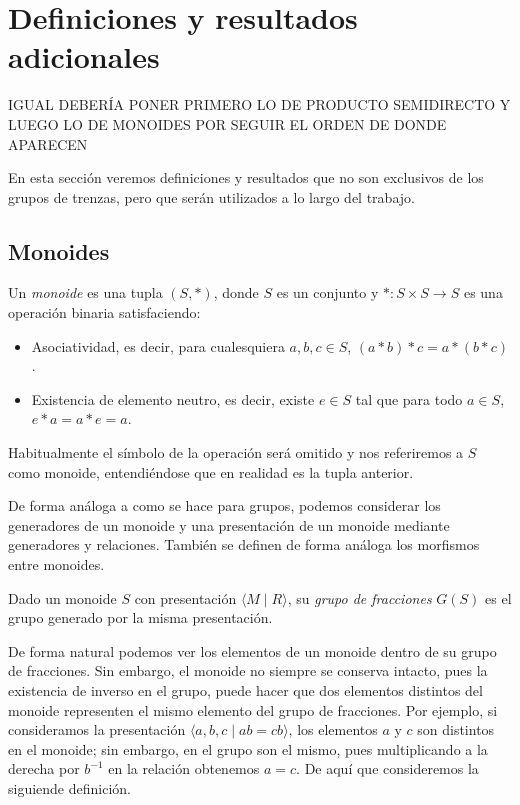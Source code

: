 \documentclass[TFG.tex]{subfiles}
\begin{document}
\section{Definiciones y resultados adicionales}

IGUAL DEBERÍA PONER PRIMERO LO DE PRODUCTO SEMIDIRECTO Y LUEGO LO DE MONOIDES POR SEGUIR EL ORDEN DE DONDE APARECEN

En esta sección veremos definiciones y resultados que no son exclusivos de los grupos de trenzas, pero que serán utilizados a lo largo del trabajo. 

\subsection{Monoides}

\begin{defi}
Un \emph{monoide} es una tupla $(S,*)$, donde $S$ es un conjunto y $*:S\times S\to S$ es una operación binaria satisfaciendo:
\begin{itemize}
\item Asociatividad, es decir, para cualesquiera $a,b,c\in S$, $(a*b)*c=a*(b*c)$.
\item Existencia de elemento neutro, es decir, existe $e\in S$ tal que para todo $a\in S$, $e*a=a*e=a$. 
\end{itemize}
Habitualmente el símbolo de la operación será omitido y nos referiremos a $S$ como monoide, entendiéndose que en realidad es la tupla anterior.
\end{defi}

De forma análoga a como se hace para grupos, podemos considerar los generadores de un monoide y una presentación de un monoide mediante generadores y relaciones. También se definen de forma análoga los morfismos entre monoides. 

\begin{defi}
Dado un monoide $S$ con presentación $\langle M\mid R\rangle$, su \emph{grupo de fracciones} $G(S)$ es el grupo generado por la misma presentación.
\end{defi}

De forma natural podemos ver los elementos de un monoide dentro de su grupo de fracciones. Sin embargo, el monoide no siempre se conserva intacto, pues la existencia de inverso en el grupo, puede hacer que dos elementos distintos del monoide representen el mismo elemento del grupo de fracciones. Por ejemplo, si consideramos la presentación $\langle a,b,c\mid ab=cb\rangle$, los elementos $a$ y $c$ son distintos en el monoide; sin embargo, en el grupo son el mismo, pues multiplicando a la derecha por $b^{-1}$ en la relación obtenemos $a=c$. De aquí que consideremos la siguiende definición.
\end{document}
